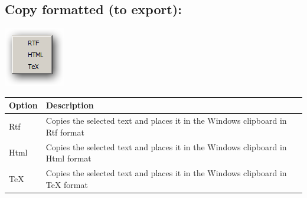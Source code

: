 \hypertarget{menu_edit_copyformatted}{}
\subsection{Copy formatted (to export):}

\includegraphics[scale=0.50]{./res/menu_edit_copyformated.png}\\

\begin{scriptsize}\begin{tabularx}{\textwidth}{>{\hsize=0.1\hsize}X>{\hsize=0.7\hsize}X}\\
    \hline
    \textbf{Option} & \textbf{Description} \\
    \hline
    Rtf & Copies the selected text and places it in the Windows clipboard in Rtf format \\
    Html & Copies the selected text and places it in the Windows clipboard in Html format \\
    TeX & Copies the selected text and places it in the Windows clipboard in TeX format \\
    \hline
  \end{tabularx}\end{scriptsize}
